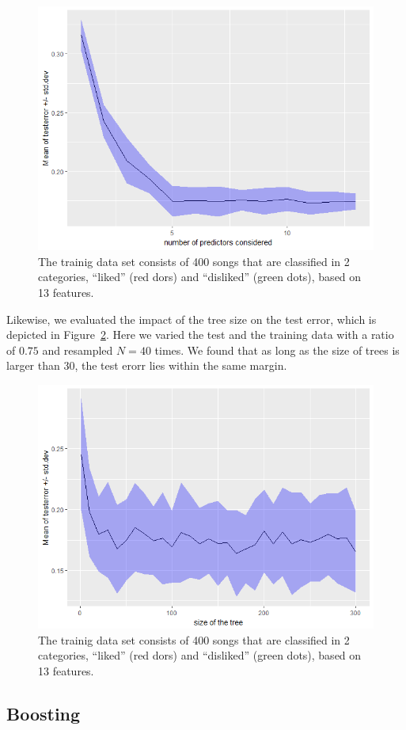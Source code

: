 \documentclass{article}
\begin{document}
\begin{figure}[htp!]
  \centering
  \includegraphics[height=0.5\textwidth] {figs/numpredictors.png}
  \caption{The trainig data set consists of 400 songs that are classified in 2 categories, ``liked'' (red dors) and ``disliked'' (green dots), based on 13 features.}
  \label{fig:numpredictors}
\end{figure}

Likewise, we evaluated the impact of the tree size on the test error, which is depicted in Figure~\ref{fig:treesize}.
Here we varied the test and the training data with a ratio of $0.75$ and resampled $N=40$ times.
We found that as long as the size of trees is larger than 30, the test erorr lies within the same margin.

\begin{figure}[htp!]
  \centering
  \includegraphics[height=0.5\textwidth] {figs/treesize.png}
  \caption{The trainig data set consists of 400 songs that are classified in 2 categories, ``liked'' (red dors) and ``disliked'' (green dots), based on 13 features.}
  \label{fig:treesize}
\end{figure}

\subsection{Boosting}
\end{document}
